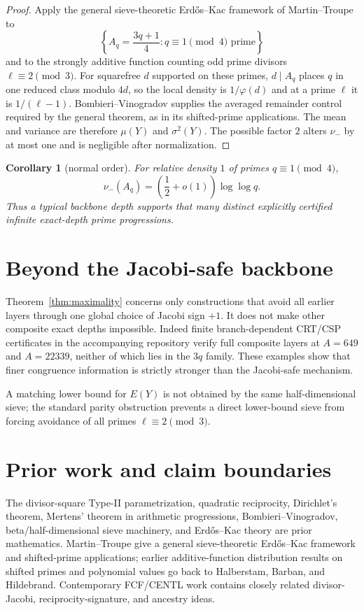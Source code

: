 \documentclass[11pt]{article}
\newtheorem{corollary}[theorem]{Corollary}
\theoremstyle{definition}
\begin{document}
\begin{proof}
Apply the general sieve-theoretic Erd\H{o}s--Kac framework of Martin--Troupe to
\[
\left\{A_q=\frac{3q+1}{4}:q\equiv1\pmod4\text{ prime}\right\}
\]
and to the strongly additive function counting odd prime divisors $\ell\equiv2\pmod3$. For squarefree $d$ supported on these primes, $d\mid A_q$ places $q$ in one reduced class modulo $4d$, so the local density is $1/\varphi(d)$ and at a prime $\ell$ it is $1/(\ell-1)$. Bombieri--Vinogradov supplies the averaged remainder control required by the general theorem, as in its shifted-prime applications. The mean and variance are therefore $\mu(Y)$ and $\sigma^2(Y)$. The possible factor $2$ alters $\nu_-$ by at most one and is negligible after normalization.
\end{proof}

\begin{corollary}[normal order]
For relative density $1$ of primes $q\equiv1\pmod4$,
\[
\nu_-(A_q)=\left(\frac12+o(1)\right)\log\log q.
\]
Thus a typical backbone depth supports that many distinct explicitly certified infinite exact-depth prime progressions.
\end{corollary}

\section{Beyond the Jacobi-safe backbone}
Theorem~\ref{thm:maximality} concerns only constructions that avoid all earlier layers through one global choice of Jacobi sign $+1$. It does not make other composite exact depths impossible. Indeed finite branch-dependent CRT/CSP certificates in the accompanying repository verify full composite layers at $A=649$ and $A=22339$, neither of which lies in the $3q$ family. These examples show that finer congruence information is strictly stronger than the Jacobi-safe mechanism.

A matching lower bound for $E(Y)$ is not obtained by the same half-dimensional sieve; the standard parity obstruction prevents a direct lower-bound sieve from forcing avoidance of all primes $\ell\equiv2\pmod3$.

\section{Prior work and claim boundaries}
The divisor-square Type-II parametrization, quadratic reciprocity, Dirichlet's theorem, Mertens' theorem in arithmetic progressions, Bombieri--Vinogradov, beta/half-dimensional sieve machinery, and Erd\H{o}s--Kac theory are prior mathematics. Martin--Troupe give a general sieve-theoretic Erd\H{o}s--Kac framework and shifted-prime applications; earlier additive-function distribution results on shifted primes and polynomial values go back to Halberstam, Barban, and Hildebrand. Contemporary FCF/CENTL work contains closely related divisor-Jacobi, reciprocity-signature, and ancestry ideas.
\end{document}
